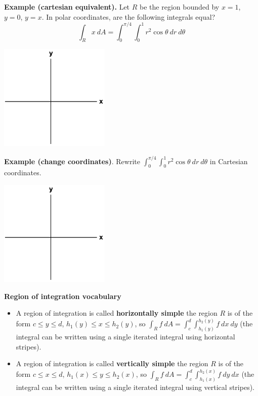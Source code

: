 \documentclass[12pt,letterpaper,noanswers]{exam}
\begin{document}

\vfill

\eject 
\noindent\textbf{Example (cartesian equivalent).}  Let $R$ be the region bounded by $x = 1$, $y=0$, $y=x$.  In polar coordinates, are the following integrals equal? \[\int_R x\ dA = \int_0^{\pi/4}\int_0^1r^2\cos\theta\ dr\ d\theta\]

\includegraphics[height=2in]{img/C02axes-2.png}






\noindent\textbf{Example (change coordinates)}.  Rewrite $\displaystyle \int_0^{\pi/4}\int_0^1r^2\cos\theta\ dr\ d\theta$ in Cartesian coordinates.  %

\includegraphics[height=2in]{img/C02axes-2.png}


\eject
\noindent\textbf{Region of integration vocabulary}
\begin{tcolorbox}
\begin{itemize}
\itemsep0em
    \item A region of integration is called \textbf{horizontally simple} the region $R$ is of the form 
$c\leq y\leq d$, 
$h_1(y)\leq x \leq h_2(y)$, so 
$\int_R f\ dA = \int_c^d\int_{h_1(y)}^{h_2(y)} f\  dx\ dy$ 
(the integral can be written using a single iterated integral using horizontal stripes).
\item A region of integration is called \textbf{vertically simple} the region $R$ is of the form $c\leq x\leq d$, $h_1(x)\leq y \leq h_2(x)$, so $\int_R f\ dA = \int_c^d\int_{h_1(x)}^{h_2(x)} f\ dy\ dx$ (the integral can be written using a single iterated integral using vertical stripes).
\end{itemize}

\end{tcolorbox}
\end{document}

